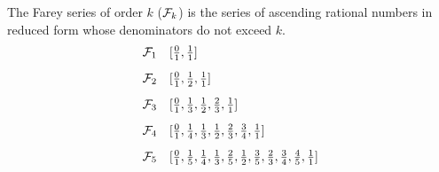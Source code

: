 \documentclass[11pt]{article}
\begin{document}


The Farey series of order $k$ (${\cal{F}}_{k}$) is the series of ascending rational
numbers in reduced form whose denominators do not exceed $k$.
\[\begin{array}{ll}
\F{1} & [ \frac{0}{1}, \frac{1}{1}] \vspace{.125in}\\
\F{2} & [ \frac{0}{1}, \frac{1}{2}, \frac{1}{1}] \vspace{.125in}\\
\F{3} & [ \frac{0}{1}, \frac{1}{3}, \frac{1}{2}, \frac{2}{3}, \frac{1}{1}] \vspace{.125in}\\
\F{4} & [ \frac{0}{1}, \frac{1}{4}, \frac{1}{3}, \frac{1}{2}, \frac{2}{3}, \frac{3}{4}, \frac{1}{1}] \vspace{.125in}\\
\F{5} & [ \frac{0}{1}, \frac{1}{5}, \frac{1}{4}, \frac{1}{3}, \frac{2}{5}, \frac{1}{2}, \frac{3}{5}, \frac{2}{3}, \frac{3}{4}, \frac{4}{5}, \frac{1}{1}] \vspace{.125in}\\

\end{array}\]
\end{document}
